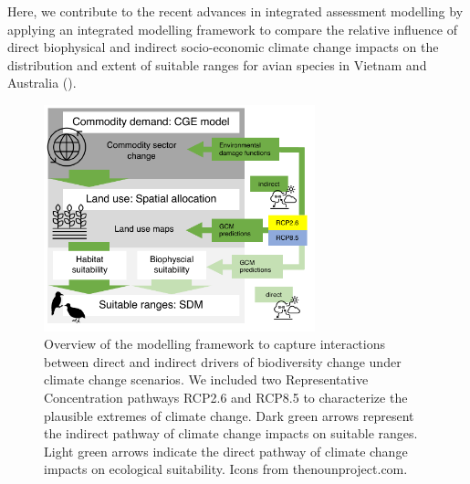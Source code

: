 Here, we contribute to the recent advances in integrated assessment modelling \citep{leclere_bending_2020,  newbold_future_2018, powers_global_2019, marques_increasing_2019} by applying an integrated modelling framework to compare the relative influence of direct biophysical and indirect socio-economic climate change impacts on the distribution and extent of suitable ranges for avian species in Vietnam and Australia ().

\begin{figure}[htb]
  \centering
  \includegraphics[width=0.7\textwidth]{chapters/figures/chapter2/fig1.pdf}
  \caption{Overview of the modelling framework to capture interactions between direct and indirect drivers of biodiversity change under climate change scenarios. We included two Representative Concentration pathways RCP2.6 and RCP8.5 to characterize the plausible extremes of climate change. Dark green arrows represent the indirect pathway of climate change impacts on suitable ranges. Light green arrows indicate the direct pathway of climate change impacts on ecological suitability. Icons from thenounproject.com.}
  \label{ch2:fig1}
\end{figure}

